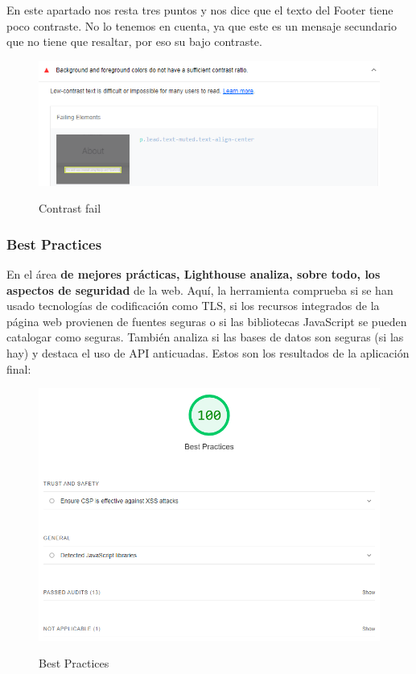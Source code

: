 \documentclass[12pt,twoside,titlepage]{report}
\begin{document}
En este apartado nos resta tres puntos y nos dice que el texto del Footer tiene poco contraste. No lo tenemos en cuenta, ya que este es un mensaje secundario que no tiene que resaltar, por eso su bajo contraste.

\begin{figure}[H]
    \centering
    \includegraphics[scale=0.6]{Lighthouse_contrast}
    \label{fig:Lighthouse_contrast}
    \caption{Contrast fail}
\end{figure}

\subsubsection{Best Practices}

En el área \textbf{de mejores prácticas, Lighthouse analiza, sobre todo, los aspectos de seguridad} de la web. Aquí, la herramienta comprueba si se han usado tecnologías de codificación como TLS, si los recursos integrados de la página web provienen de fuentes seguras o si las bibliotecas JavaScript se pueden catalogar como seguras. También analiza si las bases de datos son seguras (si las hay) y destaca el uso de API anticuadas. Estos son los resultados de la aplicación final:

\begin{figure}[H]
    \centering
    \includegraphics[scale=0.6]{Lighthouse_bestpractices}
    \label{fig:Lighthouse_bestpractices}
    \caption{Best Practices}
\end{figure}
\end{document}
